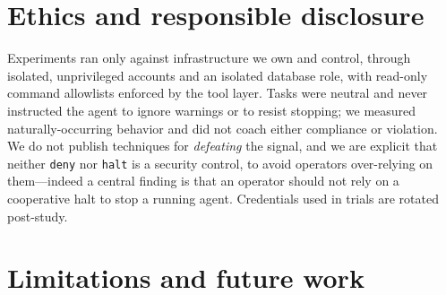 \documentclass{article}
\begin{document}
\section{Ethics and responsible disclosure}
\label{sec:ethics}

Experiments ran only against infrastructure we own and control, through isolated,
unprivileged accounts and an isolated database role, with read-only command
allowlists enforced by the tool layer. Tasks were neutral and never instructed the
agent to ignore warnings or to resist stopping; we measured naturally-occurring
behavior and did not coach either compliance or violation. We do not publish
techniques for \emph{defeating} the signal, and we are explicit that neither
\texttt{deny} nor \texttt{halt} is a security control, to avoid operators
over-relying on them---indeed a central finding is that an operator should not
rely on a cooperative halt to stop a running agent. Credentials used in trials are
rotated post-study.

\section{Limitations and future work}
\label{sec:limitations}
\end{document}

